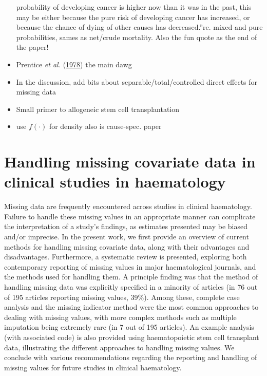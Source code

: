 \documentclass[
  letterpaper,
  DIV=11,
  numbers=noendperiod]{scrreprt}
\begin{document}
\begin{itemize}
  probability of developing cancer is higher now than it was in the
  past, this may be either because the pure risk of developing cancer
  has increased, or because the chance of dying of other causes has
  decreased.''re. mixed and pure probabilities, sames as net/crude
  mortality. Also the fun quote as the end of the paper!
\item
  Prentice \emph{et al.}
  (\protect\hyperlink{ref-prenticeAnalysisFailureTimes1978}{1978}) the
  main dawg
\item
  In the discussion, add bits about separable/total/controlled direct
  effects for missing data
\item
  Small primer to allogeneic stem cell transplantation
\item
  use \(f(\cdot)\) for density also is cause-spec. paper
\end{itemize}


\hypertarget{handling-missing-covariate-data-in-clinical-studies-in-haematology}{%
\chapter{Handling missing covariate data in clinical studies in
haematology}\label{handling-missing-covariate-data-in-clinical-studies-in-haematology}}

Missing data are frequently encountered across studies in clinical
haematology. Failure to handle these missing values in an appropriate
manner can complicate the interpretation of a study's findings, as
estimates presented may be biased and/or imprecise. In the present work,
we first provide an overview of current methods for handling missing
covariate data, along with their advantages and disadvantages.
Furthermore, a systematic review is presented, exploring both
contemporary reporting of missing values in major haematological
journals, and the methods used for handling them. A principle finding
was that the method of handling missing data was explicitly specified in
a minority of articles (in 76 out of 195 articles reporting missing
values, 39\%). Among these, complete case analysis and the missing
indicator method were the most common approaches to dealing with missing
values, with more complex methods such as multiple imputation being
extremely rare (in 7 out of 195 articles). An example analysis (with
associated code) is also provided using haematopoietic stem cell
transplant data, illustrating the different approaches to handling
missing values. We conclude with various recommendations regarding the
reporting and handling of missing values for future studies in clinical
haematology.
\end{document}
